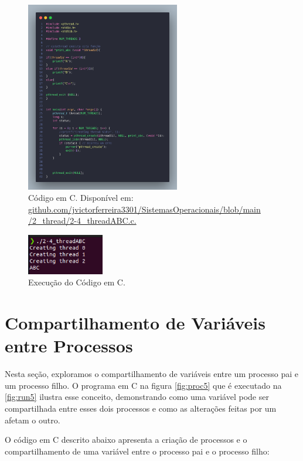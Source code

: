 \documentclass[
	12pt,				%
	openright,			%
	oneside,			%
	a4paper,			%
	chapter=TITLE,		%
	english,			%
	french,				%
	spanish,			%
	brazil				%
	]{abntex2}
\theoremstyle{definition}
\begin{document}
\begin{figure}
    \centering
    \includegraphics[width=0.6\textwidth]{imagens/processos_4.png}
	\caption{Código em C. Disponível em: \href{https://github.com/jvictorferreira3301/Sistemas_Operacionais/blob/main/2_thread/2-4_threadABC.c}{github.com/jvictorferreira3301/SistemasOperacionais/blob/main
    /2\_thread/2-4\_threadABC.c.}}
	\label{fig:proc4}
\end{figure}

\begin{figure}
    \centering
    \includegraphics[width=0.3\textwidth]{imagens/run_processos_4.png}
    \caption{Execução do Código em C.}
    \label{fig:run4}
\end{figure}

\section{Compartilhamento de Variáveis entre Processos}

Nesta seção, exploramos o compartilhamento de variáveis entre um processo pai e um 
processo filho. O programa em C na figura \ref{fig:proc5} que é executado na \ref{fig:run5} ilustra esse conceito, demonstrando 
como uma variável pode ser compartilhada entre esses dois processos e como as alterações 
feitas por um afetam o outro.

O código em C descrito abaixo apresenta a criação de processos e o compartilhamento de uma variável entre o processo pai e o processo filho:
\end{document}
